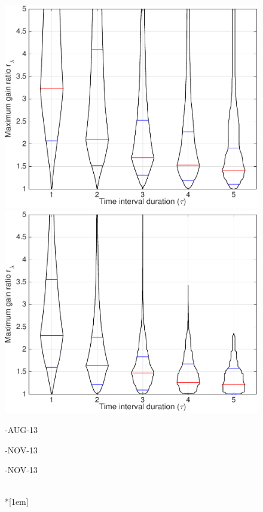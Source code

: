 \begin{figure}
\includegraphics[width=\mylength]{dist/20131106-maxGain-local-relativePerf}
\includegraphics[width=\mylength]{dist/20131111-maxGain-local-relativePerf} \\
\parbox{\mylength}{-AUG-13}
\parbox{\mylength}{-NOV-13}
\parbox{\mylength}{-NOV-13} \\*[1em]

\end{figure}
